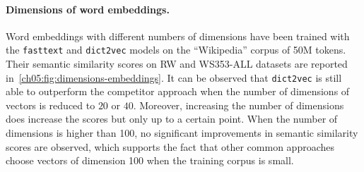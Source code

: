    \paragraph{Dimensions of word embeddings.}
      Word embeddings with different numbers of dimensions have been trained
      with the \texttt{fasttext} and \texttt{dict2vec} models on the
      ``Wikipedia'' corpus of 50M tokens. Their semantic similarity scores on RW
      and WS353-ALL datasets are reported
      in~\autoref{ch05:fig:dimensions-embeddings}. It can be observed that
      \texttt{dict2vec} is still able to outperform the competitor approach when
      the number of dimensions of vectors is reduced to $20$ or $40$. Moreover,
      increasing the number of dimensions does increase the scores but only up
      to a certain point. When the number of dimensions is higher than 100, no
      significant improvements in semantic similarity scores are observed, which
      supports the fact that other common approaches choose vectors of dimension
      100 when the training corpus is small.


